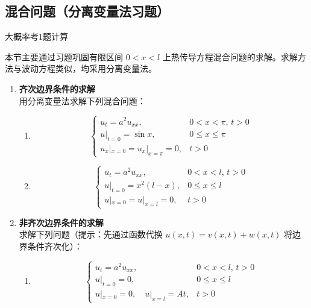 \documentclass[12pt,a4paper]{ctexart}
\begin{document}
	\subsection{混合问题（分离变量法习题）}
	
	大概率考1题计算
	
	本节主要通过习题巩固有限区间 $0 < x < l$ 上热传导方程混合问题的求解。求解方法与波动方程类似，均采用分离变量法。
	
	\begin{enumerate}
		\item \textbf{齐次边界条件的求解} \\
		用分离变量法求解下列混合问题：
		
		\begin{enumerate}
			\item 
			\begin{equation}
				\begin{cases}
					u_t = a^2 u_{xx}, & 0 < x < \pi, \, t > 0 \\
					u|_{t=0} = \sin x, & 0 \leqslant x \leqslant \pi \\
					u_x|_{x=0} = u_x|_{x=\pi} = 0, & t > 0
				\end{cases}
			\end{equation}
			
			\item 
			\begin{equation}
				\begin{cases}
					u_t = a^2 u_{xx}, & 0 < x < l, \, t > 0 \\
					u|_{t=0} = x^2(l-x), & 0 \leqslant x \leqslant l \\
					u|_{x=0} = u|_{x=l} = 0, & t > 0
				\end{cases}
			\end{equation}
		\end{enumerate}
		
		\item \textbf{非齐次边界条件的求解} \\
		求解下列问题（提示：先通过函数代换 $u(x,t) = v(x,t) + w(x,t)$ 将边界条件齐次化）：
		
		\begin{enumerate}
			\item 
			\begin{equation}
				\begin{cases}
					u_t = a^2 u_{xx}, & 0 < x < l, \, t > 0 \\
					u|_{t=0} = 0, & 0 \leqslant x \leqslant l \\
					u|_{x=0} = 0, \quad u|_{x=l} = At, & t > 0
				\end{cases}
			\end{equation}
			

\end{enumerate}
\end{enumerate}
\end{document}
